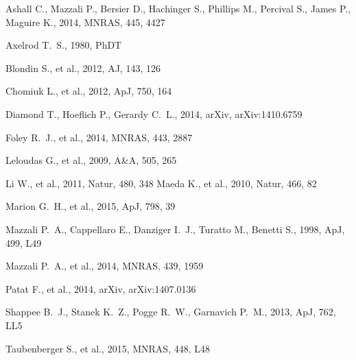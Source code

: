 \documentclass[11pt]{article}
\begin{document}
\newpage

\begin{thebibliography}{99}
Ashall C., Mazzali P., Bersier D., Hachinger S., Phillips M., Percival S., 
James P., Maguire K., 2014, MNRAS, 445, 4427

Axelrod T.~S., 1980, PhDT 

 Blondin S., et al., 2012, AJ, 143, 126 

 Chomiuk L., et al., 2012, ApJ, 750, 164 

 Diamond T., Hoeflich P., Gerardy C.~L., 2014, arXiv, arXiv:1410.6759 

Foley R.~J., et al., 2014, MNRAS, 443, 2887

 Leloudas G., et al., 2009, A\&A, 505, 265 




 Li 
W., et al., 2011, Natur, 480, 348 
Maeda K., et al., 2010, Natur, 466, 82 

Marion G.~H., et al., 2015, ApJ, 798, 39 

 Mazzali P.~A., Cappellaro E., Danziger 
I.~J., Turatto M., Benetti S., 1998, ApJ, 499, L49 

 Mazzali P.~A., et al., 2014, MNRAS, 439, 
1959 




Patat F., et al., 2014, arXiv, arXiv:1407.0136



 Shappee B.~J., Stanek K.~Z., Pogge R.~W., 
Garnavich P.~M., 2013, ApJ, 762, LL5 

 Taubenberger S., et al., 2015, MNRAS, 448, 
L48 


\end{thebibliography}
\end{document}
